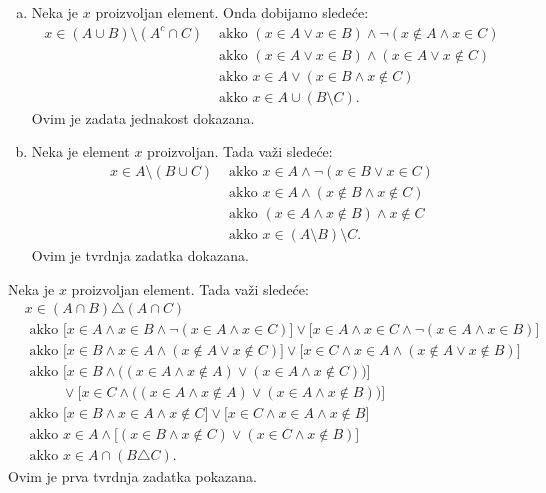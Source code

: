 {\begin{enumerate}[(a)]
\begin{align*}
&\text{ akko }(x\in A\wedge x\not\in C)\vee(x\in B\wedge x\not\in C)\\
&\text{ akko }x\in (A \setminus C) \cup (B \setminus C).
\end{align*}
Ovim je jednakost dokazana.
\item Neka je $x$ proizvoljan element. Onda dobijamo slede\' ce:
\begin{align*}
x\in  (A \cup B) \setminus (A^c \cap C)&\text{ akko } (x\in A\vee x\in B)\wedge\neg (x\not\in A\wedge x\in C)\\
&\text{ akko } (x\in A\vee x\in B)\wedge (x\in A\vee x\not\in C)\\
&\text{ akko } x\in A\vee (x\in B\wedge x\not\in C)\\
&\text{ akko } x\in A\cup(B\setminus C).
\end{align*}
Ovim je zadata jednakost dokazana.
\item Neka je element $x$ proizvoljan. Tada va\v zi slede\' ce:
\begin{align*}
x\in A \setminus (B \cup C)&\text{ akko }x\in A\wedge\neg (x\in B\vee x\in C)\\
&\text{ akko }x\in A\wedge (x\not\in B\wedge x\not\in C)\\
&\text{ akko }(x\in A\wedge x\not\in B)\wedge x\not\in C\\
&\text{ akko }x\in(A \setminus B) \setminus C.
\end{align*}
Ovim je tvrdnja zadatka dokazana.
\end{enumerate}

Neka je $x$ proizvoljan element. Tada va\v zi slede\' ce:
\begin{align*}
&x\in (A\cap B)\triangle(A\cap C)\\
&\text{ akko }\big[ x\in A\wedge x\in B \wedge \neg (x\in A\wedge x\in C) \big]\vee \big[ x\in A\wedge x\in C\wedge \neg (x\in A\wedge x\in B)   \big] \\
&\text{ akko }\big[ x\in B\wedge x\in A \wedge (x\not\in A\vee x\not\in C) \big]\vee \big[ x\in C\wedge x\in A\wedge (x\not\in A\vee x\not\in B)   \big] \\
&\text{ akko }\big[ x\in B\wedge \big((x\in A \wedge x\not\in A)\vee (x\in A \wedge x \not\in C)\big) \big]\\
&\ \ \ \ \ \ \ \ \ \ \ \ \vee \big[ x\in C\wedge \big((x\in A\wedge x\not\in A)\vee (x\in A \wedge  x\not\in B)\big)   \big] \\
&\text{ akko }\big[ x\in B\wedge x\in A \wedge x \not\in C \big]\vee \big[ x\in C\wedge x\in A \wedge  x\not\in B   \big] \\
&\text{ akko }x\in A\wedge \big[ (x\in B\wedge x\not\in C)\vee (x\in C\wedge x\not\in B)    \big]\\
&\text{ akko }x\in A\cap(B\triangle C).
\end{align*}
Ovim je prva tvrdnja zadatka pokazana.

}
